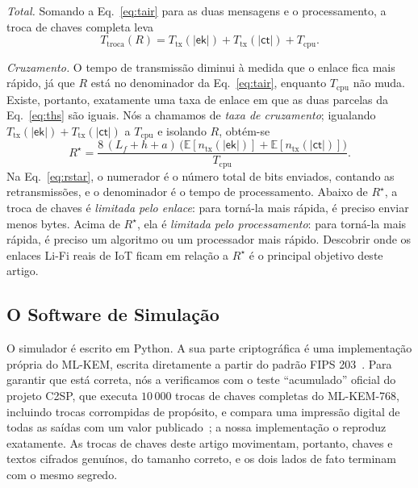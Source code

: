 \documentclass[12pt]{article}
\newcommand{\ek}{\mathsf{ek}}
\newcommand{\ct}{\mathsf{ct}}
\begin{document}
\emph{Total.} Somando a Eq.~\eqref{eq:tair} para as duas mensagens e o
processamento, a troca de chaves completa leva
\begin{equation}
T_{\mathrm{troca}}(R) = T_{\mathrm{tx}}(|\ek|) + T_{\mathrm{tx}}(|\ct|)
                   + T_{\mathrm{cpu}}.
\label{eq:ths}
\end{equation}

\emph{Cruzamento.} O tempo de transmissão diminui à medida que o enlace fica
mais rápido, já que $R$ está no denominador da Eq.~\eqref{eq:tair}, enquanto
$T_{\mathrm{cpu}}$ não muda. Existe, portanto, exatamente uma taxa de enlace em
que as duas parcelas da Eq.~\eqref{eq:ths} são iguais. Nós a chamamos de
\emph{taxa de cruzamento}; igualando
$T_{\mathrm{tx}}(|\ek|)+T_{\mathrm{tx}}(|\ct|)$ a $T_{\mathrm{cpu}}$ e
isolando $R$, obtém-se
\begin{equation}
R^{\star} = \frac{8\,(L_f+h+a)\,\big(\mathbb{E}[n_{\mathrm{tx}}(|\ek|)]
             + \mathbb{E}[n_{\mathrm{tx}}(|\ct|)]\big)}{T_{\mathrm{cpu}}} .
\label{eq:rstar}
\end{equation}
Na Eq.~\eqref{eq:rstar}, o numerador é o número total de bits enviados,
contando as retransmissões, e o denominador é o tempo de processamento. Abaixo
de $R^{\star}$, a troca de chaves é \emph{limitada pelo enlace}: para torná-la
mais rápida, é preciso enviar menos bytes. Acima de $R^{\star}$, ela é
\emph{limitada pelo processamento}: para torná-la mais rápida, é preciso um
algoritmo ou um processador mais rápido. Descobrir onde os enlaces Li-Fi reais
de IoT ficam em relação a $R^{\star}$ é o principal objetivo deste artigo.

\subsection{O Software de Simulação}\label{sec:software}
O simulador é escrito em Python. A sua parte criptográfica é uma implementação
própria do ML-KEM, escrita diretamente a partir do padrão
FIPS 203~\cite{fips203}. Para garantir que está correta, nós a verificamos com
o teste ``acumulado'' oficial do projeto C2SP, que executa $10\,000$ trocas de
chaves completas do ML-KEM-768, incluindo trocas corrompidas de propósito, e
compara uma impressão digital de todas as saídas com um valor
publicado~\cite{cctv}; a nossa implementação o reproduz exatamente. As trocas de
chaves deste artigo movimentam, portanto, chaves e textos cifrados genuínos, do
tamanho correto, e os dois lados de fato terminam com o mesmo segredo.
\end{document}
